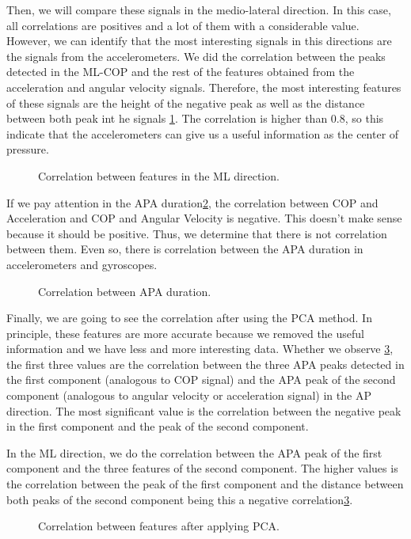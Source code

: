 Then, we will compare these signals in the medio-lateral direction. In this case, all correlations are positives and a lot of them with a considerable value. However, we can identify that the most interesting signals in this directions are the signals from the accelerometers. We did the correlation between the peaks detected in the ML-COP and the rest of the features obtained from the acceleration and angular velocity signals. Therefore, the most interesting features of these signals are the height of the negative peak as well as the distance between both peak int he signals \ref{fig:Corr_ML}. The correlation is higher than 0.8, so this indicate that the accelerometers can give us a useful information as the center of pressure.

\begin{figure}[H]
	\centering
	\caption{Correlation between features in the ML direction.}
	\label{fig:Corr_ML}
\end{figure}

If we pay attention in the APA duration\ref{fig:Corr_duration}, the correlation between COP and Acceleration and COP and Angular Velocity is negative. This doesn't make sense because it should be positive. Thus, we determine that there is not correlation between them. Even so, there is correlation between the APA duration in accelerometers and gyroscopes.
\begin{figure}[H]
	\centering
	\caption{Correlation between APA duration.}
	\label{fig:Corr_duration}
\end{figure}

Finally, we are going to see the correlation after using the PCA method. In principle, these features are more accurate because we removed the useful information and we have less and more interesting data.
Whether we observe \ref{fig:Corr_PCA}, the first three values are the correlation between the three APA peaks detected in the first component (analogous to COP signal) and the APA peak of the second component (analogous to angular velocity or acceleration signal) in the AP direction. The most significant value is the correlation between the negative peak in the first component and the peak of the second component.

In the ML direction, we do the correlation between the APA peak of the first component and the three features of the second component. The higher values is the correlation between the peak of the first component and the distance between both peaks of the second component being this a negative correlation\ref{fig:Corr_PCA}.

\begin{figure}[H]
	\centering
	\caption{Correlation between features after applying PCA.}
	\label{fig:Corr_PCA}
\end{figure}